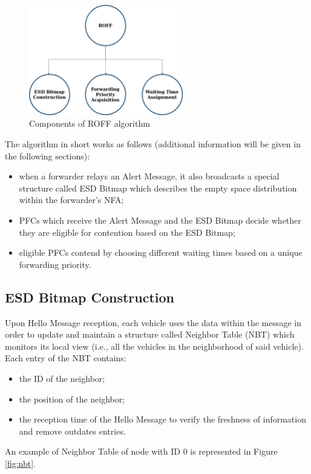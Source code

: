 		\begin{figure}[H]
			\centering
			\includegraphics[width=0.6\textwidth]{immagini/roffAlgo}
			\caption{Components of ROFF algorithm}
			\label{fig:roffAlgo}
		\end{figure}
	
		The algorithm in short works as follows (additional information will be given in the following sections):
		\begin{itemize}
			\item when a forwarder relays an Alert Message, it also broadcasts a special structure called ESD Bitmap which describes the empty space distribution within the forwarder's NFA;
			\item PFCs which receive the Alert Message and the ESD Bitmap decide whether they are eligible for contention based on the ESD Bitmap;
			\item eligible PFCs contend by choosing different waiting times based on a unique forwarding priority.
		\end{itemize}
	
		\subsection{ESD Bitmap Construction}
			Upon Hello Message reception, each vehicle uses the data within the message in order to update and maintain a structure called Neighbor Table (NBT) which monitors its local view (i.e., all the vehicles in the neighborhood of said vehicle). Each entry of the NBT contains:
			\begin{itemize}
				\item the ID of the neighbor;
				\item the position of the neighbor;
				\item the reception time of the Hello Message to verify the freshness of information and remove outdates entries.
			\end{itemize}
			An example of Neighbor Table of node with ID 0 is represented in Figure \ref{fig:nbt}.
				
